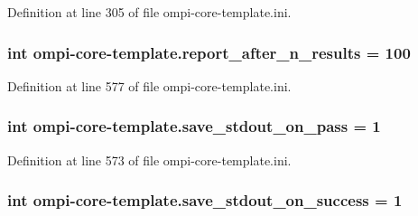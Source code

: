 Definition at line 305 of file ompi-\/core-\/template.\-ini.

\hypertarget{namespaceompi-core-template_aef79ad68e6975f586713a7e2dcc36cc3}{
\subsubsection[{report\-\_\-after\-\_\-n\-\_\-results}]{\setlength{\rightskip}{0pt plus 5cm}int ompi-\/core-\/template.\-report\-\_\-after\-\_\-n\-\_\-results = 100}}\label{namespaceompi-core-template_aef79ad68e6975f586713a7e2dcc36cc3}


Definition at line 577 of file ompi-\/core-\/template.\-ini.

\hypertarget{namespaceompi-core-template_a59c026f1667e8f33dcad2de41dafde86}{
\subsubsection[{save\-\_\-stdout\-\_\-on\-\_\-pass}]{\setlength{\rightskip}{0pt plus 5cm}int ompi-\/core-\/template.\-save\-\_\-stdout\-\_\-on\-\_\-pass = 1}}\label{namespaceompi-core-template_a59c026f1667e8f33dcad2de41dafde86}


Definition at line 573 of file ompi-\/core-\/template.\-ini.

\hypertarget{namespaceompi-core-template_a5c4b457cac4bfd0c265d8e85f6ad4d30}{
\subsubsection[{save\-\_\-stdout\-\_\-on\-\_\-success}]{\setlength{\rightskip}{0pt plus 5cm}int ompi-\/core-\/template.\-save\-\_\-stdout\-\_\-on\-\_\-success = 1}}\label{namespaceompi-core-template_a5c4b457cac4bfd0c265d8e85f6ad4d30}


